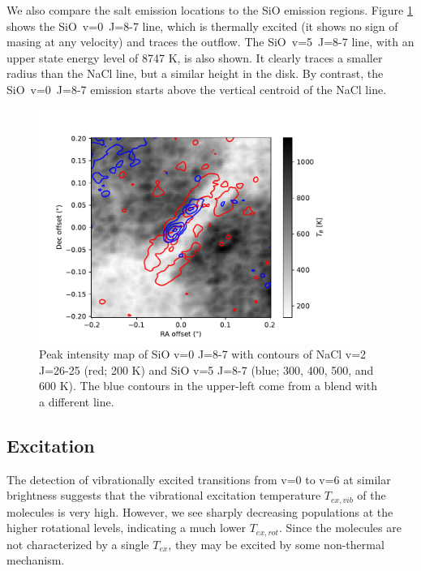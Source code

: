 \documentclass[twocolumn]{aastex62}
\begin{document}
We also compare the salt emission locations to the SiO emission regions.
Figure \ref{fig:sioonnacl} shows the \mbox{SiO v=0 J=8-7} line, which is thermally
excited (it shows no sign of masing at any velocity) and traces the outflow.
The \mbox{SiO v=5 J=8-7} line, with an upper state energy level of 8747 K, 
is also shown.  It clearly traces a smaller radius than the NaCl line, but
a similar height in the disk.  By contrast, the \mbox{SiO v=0 J=8-7} emission starts
above the vertical centroid of the NaCl line.


\begin{figure}[!htp]
\includegraphics[scale=1,width=4in]{figures/SiO_8-7_on_NaClv=2_26-25.pdf}
\caption{Peak intensity map of SiO v=0 J=8-7 with contours of NaCl v=2 J=26-25
(red; 200 K) and {SiO v=5 J=8-7} (blue; 300, 400, 500, and 600 K).  The blue
contours in the upper-left come from a blend with a different line.
}
\label{fig:sioonnacl}
\end{figure}



\subsection{Excitation}
The detection of vibrationally excited transitions from v=0 to v=6 at similar brightness
suggests that the vibrational excitation temperature $T_{ex,vib}$ of the molecules
is very high.  However, we see sharply decreasing populations at the higher
rotational levels, indicating a much lower $T_{ex,rot}$.  Since the molecules are
not characterized by a single $T_{ex}$, they may be excited by some
non-thermal mechanism.
\end{document}
